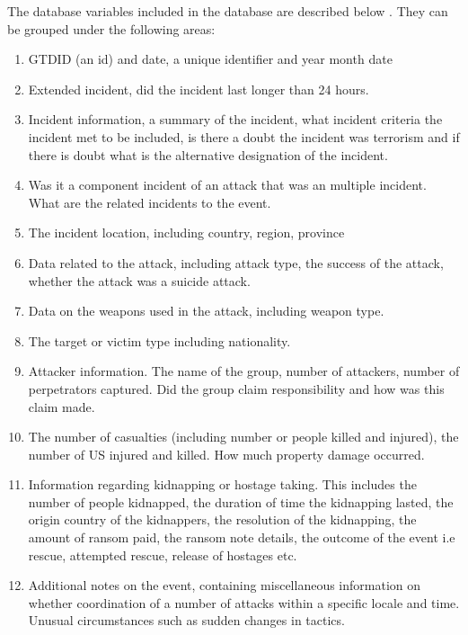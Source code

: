 The database variables included in the database are described below . They can be grouped under the following areas:
\begin{enumerate}
\item GTDID (an id) and date, a unique identifier and year month date
\item Extended incident, did the incident last longer than 24 hours.
\item Incident information, a summary of the incident, what incident criteria the incident met to be included, is there a doubt the incident was terrorism and if there is doubt what is the alternative designation of the incident. 
\item Was it a component incident of an attack that was an multiple incident. What are the related incidents to the event.
\item The incident location, including country, region, province 
\item  Data related to the attack, including attack type, the success of the attack, whether the attack was a suicide attack.
\item Data on the weapons used in the attack, including weapon type.
\item The target or victim type including nationality.
\item Attacker information. The name of the group, number of attackers, number of perpetrators captured. Did the group claim responsibility and how was this claim made.
\item The number of casualties (including number or people killed and injured), the number of US injured and killed. How much property damage occurred.
\item Information regarding kidnapping or hostage taking. This includes the number of people kidnapped, the duration of time the kidnapping lasted, the origin country of the kidnappers, the resolution of the kidnapping, the amount of ransom paid, the ransom note details, the outcome of the event i.e rescue, attempted rescue, release of hostages etc.  
\item Additional notes on the event, containing miscellaneous information on whether coordination of a number of attacks within a specific locale and time. Unusual circumstances such as sudden changes in tactics.
\end{enumerate}

